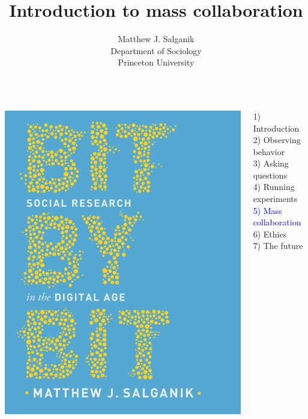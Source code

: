 \documentclass[aspectratio=169]{beamer}
\title[]{Introduction to mass collaboration}
\author[]{Matthew J. Salganik\\Department of Sociology\\Princeton University}
\date[]{%
\begin{flushright}
\texttt{[image: figures/cc-by.png]}
\end{flushright}
}
\begin{document}
\frame{\titlepage}
\begin{frame}

\begin{columns}
\begin{column}{.40\textwidth}
\includegraphics[width=\textwidth]{figures/salganik_bit_2018_cover}
\end{column}%

\hfill%

\begin{column}{.60\textwidth}
1) Introduction \\
2) Observing behavior \\
3) Asking questions \\
4) Running experiments \\
\textcolor{blue}{5) Mass collaboration} \\
6) Ethics \\
7) The future \\
\end{column}%
\end{columns}

\end{frame}
\end{document}
